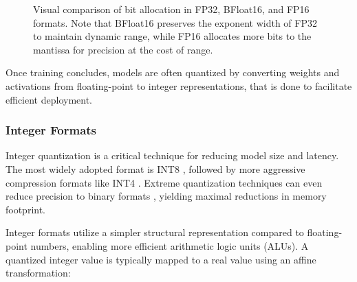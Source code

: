 \begin{figure}[H]
  \caption{Visual comparison of bit allocation in FP32, BFloat16, and FP16 formats. Note that BFloat16 preserves the exponent width of FP32 to maintain dynamic range, while FP16 allocates more bits to the mantissa for precision at the cost of range.}
  \label{fig:dtypes}
\end{figure}

Once training concludes, models are often quantized by converting weights and activations from floating-point to integer representations, that is done to facilitate efficient deployment.

\subsubsection{Integer Formats}

Integer quantization is a critical technique for reducing model size and latency. The most widely adopted format is INT8 \cite{jacob2018quantization, dettmers2022llm}, followed by more aggressive compression formats like INT4 \cite{wu2023understanding}. Extreme quantization techniques can even reduce precision to binary formats \cite{hubara2016binarized}, yielding maximal reductions in memory footprint.

Integer formats utilize a simpler structural representation compared to floating-point numbers, enabling more efficient arithmetic logic units (ALUs). A quantized integer value is typically mapped to a real value using an affine transformation:

